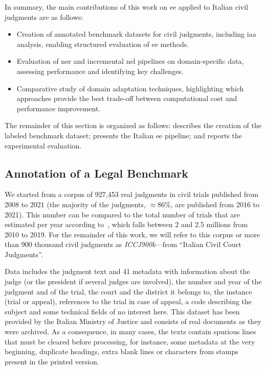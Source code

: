 In summary, the main contributions of this work on \ac{ee} applied to Italian civil judgments are as follows:
\begin{itemize}
    \item Creation of annotated benchmark datasets for civil judgments, including \acf{iaa} analysis, enabling structured evaluation of \ac{ee} methods.
    \item Evaluation of \ac{ner} and incremental \ac{nel} pipelines on domain-specific data, assessing performance and identifying key challenges.
    \item Comparative study of domain adaptation techniques, highlighting which approaches provide the best trade-off between computational cost and performance improvement.
\end{itemize}

The remainder of this section is organized as follows:  describes the creation of the labeled benchmark dataset;  presents the Italian \ac{ee} pipeline; and  reports the experimental evaluation.


\subsection{Annotation of a Legal Benchmark}
\label{sec:judgements_labeled_data}

We started from a corpus of 927,453 real judgments in civil trials published from 2008 to 2021 (the majority of the judgments, $\approx 86\%$, are published from 2016 to 2021).
This number can be compared to the total number of trials that are estimated per year according to~\cite{bankitalia}, which falls between 2 and 2.5 millions from 2010 to 2019.
For the remainder of this work, we will refer to this corpus or more than 900 thousand civil judgments as \emph{ICCJ900k}---from ``Italian Civil Court Judgments''.

Data includes the judgment text and 41 metadata with information about the judge (or the president if several judges are involved), the number and year of the judgment and of the trial, the court and the district it belongs to, the instance (trial or appeal), references to the trial in case of appeal, a code describing the subject and some technical fields of no interest here. This dataset has been provided by the Italian Ministry of Justice and consists of real documents as they were archived. As a consequence, in many cases, the texts contain spurious lines that must be cleared before processing, for instance, some metadata at the very beginning, duplicate headings, extra blank lines or characters from stamps present in the printed version.

